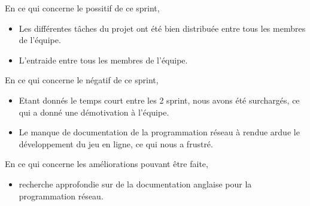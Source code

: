 En ce qui concerne le possitif de ce sprint, 
\begin{itemize}
	\item Les différentes tâches du projet ont été bien distribuée entre tous les membres de l'équipe.
	\item L'entraide entre tous les membres de l'équipe.
\end{itemize}

En ce qui concerne le négatif de ce sprint,
\begin{itemize}
	\item Etant donnés le temps court entre les 2 sprint, nous avons été surchargés, ce qui a donné une démotivation à l'équipe.
	\item Le manque de documentation de la programmation réseau à rendue ardue le développement du jeu en ligne, ce qui nous a frustré. 
\end{itemize} 

En ce qui concerne les améliorations pouvant être faite,
\begin{itemize}
	\item recherche approfondie sur de la documentation anglaise pour la programmation réseau.
\end{itemize}